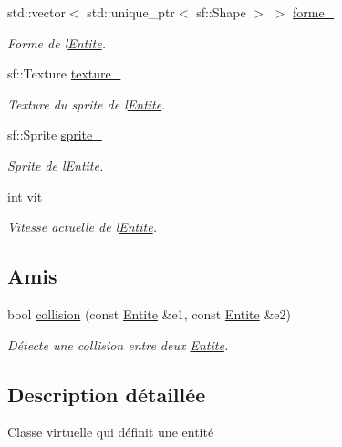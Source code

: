 \begin{DoxyCompactItemize}
std\+::vector$<$ std\+::unique\+\_\+ptr$<$ sf\+::\+Shape $>$ $>$ \hyperlink{class_entite_aa6bbda9a40f701f273c344406a6f5122}{forme\+\_\+}
\begin{DoxyCompactList}\small\item\em Forme de l\textquotesingle{}\hyperlink{class_entite}{Entite}. \end{DoxyCompactList}\item 
sf\+::\+Texture \hyperlink{class_entite_a8147b9459318a9b1de1b72dce115680a}{texture\+\_\+}
\begin{DoxyCompactList}\small\item\em Texture du sprite de l\textquotesingle{}\hyperlink{class_entite}{Entite}. \end{DoxyCompactList}\item 
sf\+::\+Sprite \hyperlink{class_entite_ab7c03b6fe5c4f1d08cd3e4304e0ef7c0}{sprite\+\_\+}
\begin{DoxyCompactList}\small\item\em Sprite de l\textquotesingle{}\hyperlink{class_entite}{Entite}. \end{DoxyCompactList}\item 
int \hyperlink{class_entite_a62c3145096f707457d60306ea6729ed6}{vit\+\_\+}
\begin{DoxyCompactList}\small\item\em Vitesse actuelle de l\textquotesingle{}\hyperlink{class_entite}{Entite}. \end{DoxyCompactList}\end{DoxyCompactItemize}
\subsection*{Amis}
\begin{DoxyCompactItemize}
\item 
bool \hyperlink{class_entite_ac5011435e5099909dd34cd1750933b30}{collision} (const \hyperlink{class_entite}{Entite} \&e1, const \hyperlink{class_entite}{Entite} \&e2)
\begin{DoxyCompactList}\small\item\em Détecte une collision entre deux \hyperlink{class_entite}{Entite}. \end{DoxyCompactList}\end{DoxyCompactItemize}


\subsection{Description détaillée}
Classe virtuelle qui définit une entité 

